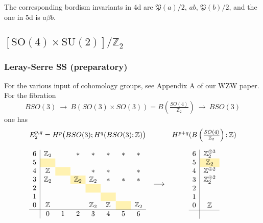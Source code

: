 \documentclass[12pt]{article}
\numberwithin{equation}{section}
\def\bZ{\mathbb{Z}}
\def\fP{\mathfrak{P}}
\def\SU{\mathrm{SU}}
\def\SO{\mathrm{SO}}
\begin{document}
The corresponding bordism invariants in 4d are $\fP(a)/2$, $ab$, $\fP(b)/2$, 
and the one in 5d is $a\beta b$.

\subsection{$[\SO(4)\times \SU(2)]/\bZ_2$}
\label{sec:so4su2}

\subsubsection{Leray-Serre SS (preparatory)}
For the various input of cohomology groups, see Appendix A of our WZW paper.
For the fibration
\begin{equation}
	BSO(3)
	\ \to\ 
	B\left(SO(3)\times SO(3)\right)
	=
	B\left(\tfrac{SO(4)}{\bZ_2}\right)
	\ \to\ 
	BSO(3)
\end{equation}
one has
\begin{equation}
	\begin{array}{ccc}
		E_2^{p,q}=H^p\big(BSO(3);H^q(BSO(3);\bZ)\big) && H^{p+q}(B\left(\tfrac{SO(4)}{\bZ_2}\right);\bZ)\vspace{4mm}\\
		\begin{array}{c|ccccccccccccc}
			6 & \bZ_2 && \ast & \ast & \ast & \ast & \ast \\
			5  & \hphantom{\bZ_2}\cellcolor{lightyellow} & \hphantom{\bZ_2} & \hphantom{\bZ_2} & \hphantom{\bZ_2} & \hphantom{\bZ_2} & \hphantom{\bZ_2} \\
			4  & \bZ & \cellcolor{lightyellow} && \ast & \ast && \ast\\
			3  & \bZ_2 && \bZ_2\cellcolor{lightyellow} & \bZ_2 & \ast & \ast & \ast \\
			2  & &  && \cellcolor{lightyellow} &&\\
			1  &  &&  && \cellcolor{lightyellow} &&\\
			0 & \bZ &  && \bZ_2 & \bZ & \cellcolor{lightyellow} & \bZ_2\\
			\hline
			& 0 & 1 & 2 & 3 & 4 & 5 & 6 \\
		\end{array}
		& \longrightarrow & 
		\begin{array}{c|c}
			6  &\bZ_2^{\oplus 3}\\
			5  & \bZ_2\cellcolor{lightyellow}\\
			4  & \bZ^{\oplus 2}\\
			3  & \bZ_2^{\oplus 2}\\
			2  & \\
			1  & \\
			0 & \bZ\\
			\hline\\
		\end{array}
	\end{array}
\end{equation}
\end{document}
